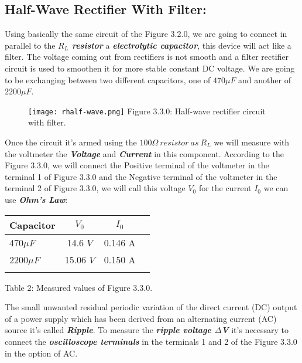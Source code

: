 \subsection{Half-Wave Rectifier With Filter:}

Using basically the same circuit of the Figure 3.2.0, we are going to connect in parallel to the {\bfseries\itshape $R_{L}$ resistor} a {\bfseries\itshape electrolytic capacitor}, this device will act like a filter. The voltage coming out from rectifiers is not smooth and a filter rectifier circuit is used to smoothen it for more stable constant DC voltage. We are going to be exchanging between two different capacitors, one of $470\mu F$ and another of $2200\mu F$.

\begin{figure}[H]
\texttt{[image: rhalf-wave.png]}
\centering \linebreak \linebreak Figure 3.3.0: Half-wave rectifier circuit with filter.
\end{figure} 

Once the circuit it's armed using the $100\Omega\ resistor\ as\ R_{L}$ we will measure with the voltmeter the {\bfseries\itshape Voltage} and {\bfseries\itshape Current} in this component. According to the Figure 3.3.0, we will connect the Positive terminal of the voltmeter in the terminal 1 of Figure 3.3.0 and the Negative terminal of the voltmeter in the terminal 2 of Figure 3.3.0, we will call this voltage $V_{0}$ for the current $I_{0}$ we can use {\bfseries\itshape Ohm's Law}: \hfill \break

{\bfseries\itshape{}} \hfill \break

\begin{center}
\begin{tabular}[.5cm]{l c c c}
\toprule
Capacitor & $V_{0}$ & $I_{0}$ \\
\midrule
470$\mu F$ & 14.6 $V$ & 0.146 A \\
\cmidrule{1-3}
2200$\mu F$ & 15.06 $V$ & 0.150 A \\
\bottomrule
\linebreak
\end{tabular}
\centering \linebreak Table 2: Measured values of Figure 3.3.0.
\end{center} \hfill

The small unwanted residual periodic variation of the direct current (DC) output of a power supply which has been derived from an alternating current (AC) source it's called {\bfseries\itshape Ripple}. To measure the {\bfseries\itshape ripple voltage $\Delta$V} it's necessary to connect the {\bfseries\itshape oscilloscope terminals} in the terminals 1 and 2 of the Figure 3.3.0 in the option of AC.

